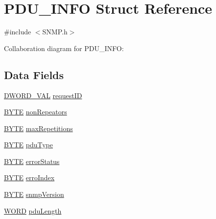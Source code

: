 \hypertarget{struct_p_d_u___i_n_f_o}{}\section{P\+D\+U\+\_\+\+I\+N\+F\+O Struct Reference}
\label{struct_p_d_u___i_n_f_o}


{\ttfamily \#include $<$S\+N\+M\+P.\+h$>$}



Collaboration diagram for P\+D\+U\+\_\+\+I\+N\+F\+O\+:
\subsection*{Data Fields}
\begin{DoxyCompactItemize}
\item 
\hyperlink{union_d_w_o_r_d___v_a_l}{D\+W\+O\+R\+D\+\_\+\+V\+A\+L} \hyperlink{struct_p_d_u___i_n_f_o_a02f8c209c65db5aef871df3b9f09c26c}{request\+I\+D}
\item 
\hyperlink{_generic_type_defs_8h_a4ae1dab0fb4b072a66584546209e7d58}{B\+Y\+T\+E} \hyperlink{struct_p_d_u___i_n_f_o_a78778c854d4976cd215332135a88e589}{non\+Repeators}
\item 
\hyperlink{_generic_type_defs_8h_a4ae1dab0fb4b072a66584546209e7d58}{B\+Y\+T\+E} \hyperlink{struct_p_d_u___i_n_f_o_a3101f6b3570815526a73d81dd9f5007a}{max\+Repetitions}
\item 
\hyperlink{_generic_type_defs_8h_a4ae1dab0fb4b072a66584546209e7d58}{B\+Y\+T\+E} \hyperlink{struct_p_d_u___i_n_f_o_ad106adfabb3dc56cdc2d52727d9771c5}{pdu\+Type}
\item 
\hyperlink{_generic_type_defs_8h_a4ae1dab0fb4b072a66584546209e7d58}{B\+Y\+T\+E} \hyperlink{struct_p_d_u___i_n_f_o_ad62a4b671c84af2175a8ced889bc4eed}{error\+Status}
\item 
\hyperlink{_generic_type_defs_8h_a4ae1dab0fb4b072a66584546209e7d58}{B\+Y\+T\+E} \hyperlink{struct_p_d_u___i_n_f_o_a3b65c69b517f5a0ce9f9fdd58c43755e}{erro\+Index}
\item 
\hyperlink{_generic_type_defs_8h_a4ae1dab0fb4b072a66584546209e7d58}{B\+Y\+T\+E} \hyperlink{struct_p_d_u___i_n_f_o_a11089a22af489151204a9d57e75429ad}{snmp\+Version}
\item 
\hyperlink{_generic_type_defs_8h_a2b0e863dadf920709ec53d9088ee7c91}{W\+O\+R\+D} \hyperlink{struct_p_d_u___i_n_f_o_accf719234a4cc4f2703bdf4d68042c5e}{pdu\+Length}
\end{DoxyCompactItemize}


